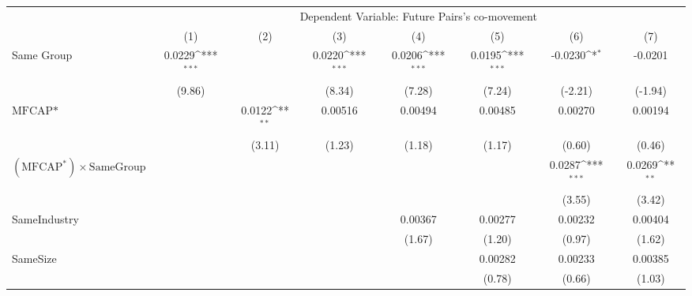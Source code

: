 {
\def\sym#1{\ifmmode^{#1}\else\(^{#1}\)\fi}
\begin{tabular}{l*{7}{c}}
\hline\hline
                &\multicolumn{7}{c}{Dependent Variable: Future Pairs's co-movement}                                                                  \\\cmidrule(lr){2-8}
                &\multicolumn{1}{c}{(1)}         &\multicolumn{1}{c}{(2)}         &\multicolumn{1}{c}{(3)}         &\multicolumn{1}{c}{(4)}         &\multicolumn{1}{c}{(5)}         &\multicolumn{1}{c}{(6)}         &\multicolumn{1}{c}{(7)}         \\
\hline
Same Group      &   0.0229\sym{***}&                  &   0.0220\sym{***}&   0.0206\sym{***}&   0.0195\sym{***}&  -0.0230\sym{*}  &  -0.0201         \\
                &   (9.86)         &                  &   (8.34)         &   (7.28)         &   (7.24)         &  (-2.21)         &  (-1.94)         \\
[1em]
$ \text{MFCAP*} $&                  &   0.0122\sym{**} &  0.00516         &  0.00494         &  0.00485         &  0.00270         &  0.00194         \\
                &                  &   (3.11)         &   (1.23)         &   (1.18)         &   (1.17)         &   (0.60)         &   (0.46)         \\
[1em]
 $ (\text{MFCAP}^*) \times {\text{SameGroup} }  $ &                  &                  &                  &                  &                  &   0.0287\sym{***}&   0.0269\sym{**} \\
                &                  &                  &                  &                  &                  &   (3.55)         &   (3.42)         \\
[1em]
SameIndustry    &                  &                  &                  &  0.00367         &  0.00277         &  0.00232         &  0.00404         \\
                &                  &                  &                  &   (1.67)         &   (1.20)         &   (0.97)         &   (1.62)         \\
[1em]
SameSize        &                  &                  &                  &                  &  0.00282         &  0.00233         &  0.00385         \\
                &                  &                  &                  &                  &   (0.78)         &   (0.66)         &   (1.03)         \\

\end{tabular}}
